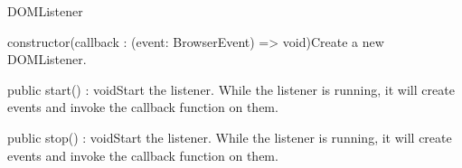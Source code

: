 \begin{class}{DOMListener}




\begin{constructors}
\begin{constructor}{constructor(callback : (event: BrowserEvent) => void)}{Create a new DOMListener.}
\begin{parameters}
\end{parameters}
\end{constructor}
\end{constructors}
\begin{methods}
\begin{method}{public start() : void}{Start the listener. While the listener is running, it will create events and invoke the callback function on them.}
\end{method}
\begin{method}{public stop() : void}{Start the listener. While the listener is running, it will create events and invoke the callback function on them.}
\end{method}
\end{methods}
\end{class}

